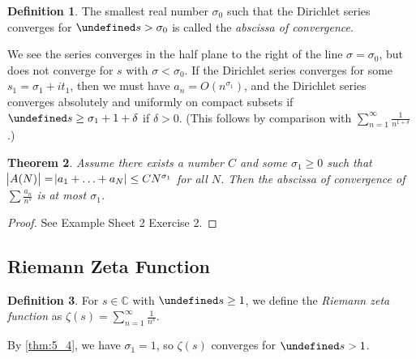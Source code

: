 \documentclass[11pt]{article}
\theoremstyle{definition}
\newtheorem{definition}{Definition}[section]
\theoremstyle{plain}
\newtheorem{theorem}[definition]{Theorem}
\theoremstyle{remark}
\let\Re\undefined
\DeclareMathOperator{\Re}{Re}
\newcommand{\CC}{\mathbb{C}}
\begin{document}
\begin{definition}\label{def:5_3}
    The smallest real number $\sigma_0$ such that the Dirichlet series converges for $\Re s > \sigma_0$ is called the \emph{abscissa of convergence}.
\end{definition}

We see the series converges in the half plane to the right of the line $\sigma = \sigma_0$, but does not converge for $s$ with $\sigma < \sigma_0$. If the Dirichlet series converges for some $s_1 = \sigma_1 + i t_1$, then we must have $a_n = O(n^{\sigma_1})$, and the Dirichlet series converges absolutely and uniformly on compact subsets if $\Re s \ge \sigma_1 + 1 + \delta$ if $\delta > 0$. (This follows by comparison with $\sum_{n=1}^{\infty} \frac{1}{n^{1+\delta}}$.)

\begin{theorem}\label{thm:5_4}
    Assume there exists a number $C$ and some $\sigma_1 \ge 0$ such that $\abs{A(N)} = \abs{a_1 + \ldots + a_N} \le C N^{\sigma_1}$ for all $N$. Then the abscissa of convergence of $\sum \frac{a_n}{n^s}$ is at most $\sigma_1$.
\end{theorem}
\begin{proof}
    See Example Sheet 2 Exercise 2.
\end{proof}

\subsection{Riemann Zeta Function}

\begin{definition}\label{def:5_5}
    For $s \in \CC$ with $\Re s \ge 1$, we define the \emph{Riemann zeta function} as $\zeta(s) = \sum_{n=1}^\infty \frac{1}{n^s}$.
\end{definition}

\noindent By \autoref{thm:5_4}, we have $\sigma_1 = 1$, so $\zeta(s)$ converges for $\Re s > 1$.
\end{document}

